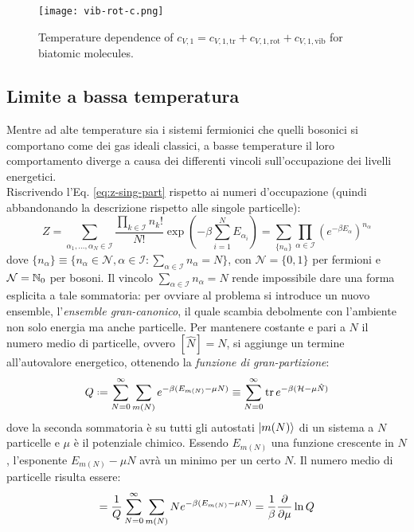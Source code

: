 \begin{figure}
	\centering
	\texttt{[image: vib-rot-c.png]}
	\caption{Temperature dependence of $ c_{V,1} = c_{V,1,\text{tr}} + c_{V,1,\text{rot}} + c_{V,1,\text{vib}} $ for biatomic molecules.}
	\label{vib-rot-c}
\end{figure}

\subsection{Limite a bassa temperatura}

Mentre ad alte temperature sia i sistemi fermionici che quelli bosonici si comportano come dei gas ideali classici, a basse temperature il loro comportamento diverge a causa dei differenti vincoli sull'occupazione dei livelli energetici. \\
Riscrivendo l'Eq. \ref{eq:z-sing-part} rispetto ai numeri d'occupazione (quindi abbandonando la descrizione rispetto alle singole particelle):
\begin{equation}
	Z = \sum_{\alpha_1, \dots, \alpha_N \in \mathcal{I}} \frac{\prod_{k \in \mathcal{I}} n_k!}{N!} \exp \left( -\beta \sum_{i = 1}^N E_{\alpha_i} \right) = \sum_{\{n_\alpha\}} \prod_{\alpha \in \mathcal{I}} \left( e^{-\beta E_\alpha} \right)^{n_\alpha}
	\label{eq:z-n-occ}
\end{equation}
dove $ \{n_\alpha\} \equiv \{n_\alpha \in \mathcal{N}, \alpha \in \mathcal{I} : \sum_{\alpha \in \mathcal{I}} n_\alpha = N\} $, con $ \mathcal{N} = \{0,1\} $ per fermioni e $ \mathcal{N} = \mathbb{N}_0 $ per bosoni. Il vincolo $ \sum_{\alpha \in \mathcal{I}} n_\alpha = N $ rende impossibile dare una forma esplicita a tale sommatoria: per ovviare al problema si introduce un nuovo ensemble, l'\textit{ensemble gran-canonico}, il quale scambia debolmente con l'ambiente non solo energia ma anche particelle. Per mantenere costante e pari a $ N $ il numero medio di particelle, ovvero $ [\hat{N}] = N $, si aggiunge un termine all'autovalore energetico, ottenendo la \textit{funzione di gran-partizione}:
\begin{equation}
	Q \defeq \sum_{N = 0}^\infty \sum_{m(N)} e^{- \beta (E_{m(N)} - \mu N)} \equiv \sum_{N = 0}^\infty \tr e^{- \beta (\mathcal{H} - \mu \hat{N})}
\end{equation}
dove la seconda sommatoria è su tutti gli autostati $ \ket{m(N)} $ di un sistema a $ N $ particelle e $ \mu $ è il potenziale chimico. Essendo $ E_{m(N)} $ una funzione crescente in $ N $, l'esponente $ E_{m(N)} - \mu N $ avrà un minimo per un certo $ N $. Il numero medio di particelle risulta essere:
\begin{equation*}
	[\hat{N}] = \frac{1}{Q} \sum_{N = 0}^\infty \sum_{m(N)} N e^{-\beta (E_{m(N)} - \mu N)} = \frac{1}{\beta} \frac{\pa}{\pa \mu} \ln Q
\end{equation*}

